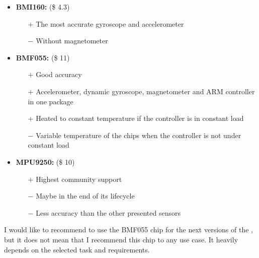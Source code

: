 \begin{itemize}
    \item \textbf{BMI160:} (\$ 4.3) \cite{bosch:BMI160}
    \begin{itemize}
        \item[$+$] The most accurate gyroscope and accelerometer
        \item[$-$] Without magnetometer
    \end{itemize}
    \item \textbf{BMF055:} (\$ 11) \cite{bosch:BMF055}
    \begin{itemize}
        \item[$+$] Good accuracy
        \item[$+$] Accelerometer, dynamic gyroscope, magnetometer and \ac{ARM} controller in one package
        \item[$+$] Heated to constant temperature if the controller is in constant load
        \item[$-$] Variable temperature of the chips when the controller is not under constant load
    \end{itemize}
    \item \textbf{MPU9250:} (\$ 10) \cite{invensense:MPU9250}
    \begin{itemize}
        \item[$+$] Highest community support
        \item[$-$] Maybe in the end of its lifecycle
        \item[$-$] Less accuracy than the other presented sensors
    \end{itemize}
\end{itemize}

I would like to recommend to use the BMF055 chip for the next versions of the , but it does not mean that I recommend this chip to any use case. It heavily depends on the selected task and requirements.
